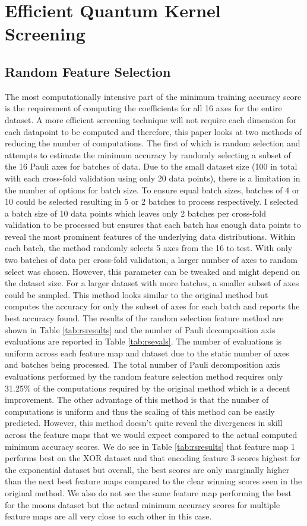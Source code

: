 \documentclass[
	a4paper, %
	10pt, %
	unnumberedsections, %
	twoside, %
]{LTJournalArticle}
\begin{document}
\section{Efficient Quantum Kernel Screening}
\subsection{Random Feature Selection}
The most computationally intensive part of the minimum training accuracy score is the requirement of computing the coefficients for all 16 axes for the entire dataset. A more efficient screening 
technique will not require each dimension for each datapoint to be computed and therefore, this paper looks at two methods of reducing the number of computations. The first of which is random 
selection and attempts to estimate the minimum accuracy by randomly selecting a subset of the 16 Pauli axes for batches of data. Due to the small dataset size (100 in total with each cross-fold 
validation using only 20 data points), there is a limitation in the number of options for batch size. To ensure equal batch sizes, batches of 4 or 10 could be selected resulting in 5 or 2 batches 
to process respectively. I selected a batch size of 10 data points which leaves only 2 batches per cross-fold validation to be processed but ensures that each batch has enough data points to 
reveal the most prominent features of the underlying data distributions. Within each batch, the method randomly selects 5 axes from the 16 to test. With only two batches of data per cross-fold 
validation, a larger number of axes to random select was chosen. However, this parameter can be tweaked and might depend on the dataset size. For a larger dataset with more batches, a smaller 
subset of axes could be sampled. This method looks similar to the original method but computes the accuracy for only the subset of axes for each batch and reports the best accuracy found. The 
results of the random selection feature method are shown in Table \ref{tab:rsresults} and the number of Pauli decomposition axis evaluations are reported in Table \ref{tab:rsevals}. The number of evaluations is uniform across 
each feature map and dataset due to the static number of axes and batches being processed. The total number of Pauli decomposition axis evaluations performed by the random feature selection 
method requires only 31.25\% of the computations required by the original method which is a decent improvement. The other advantage of this method is that the number of computations is uniform 
and thus the scaling of this method can be easily predicted. However, this method doesn't quite reveal the divergences in skill across the feature maps that we would expect compared to the actual 
computed minimum accuracy scores. We do see in Table \ref{tab:rsresults} that feature map 1 performs best on the XOR dataset and that encoding feature 3 scores highest for the exponential dataset 
but overall, the best scores are only marginally higher than the next best feature maps compared to the clear winning scores seen in the original method. We also do not see the same feature map 
performing the best for the moons dataset but the actual minimum accuracy scores for multiple feature maps are all very close to each other in this case.
\end{document}
